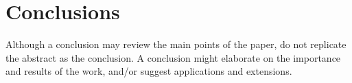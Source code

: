 \section{Conclusions}\label{sec:discuss}

Although a conclusion may review the main points of the paper, do not replicate the abstract as the conclusion. A conclusion might elaborate on the importance and results of the work, and/or suggest applications and extensions.
